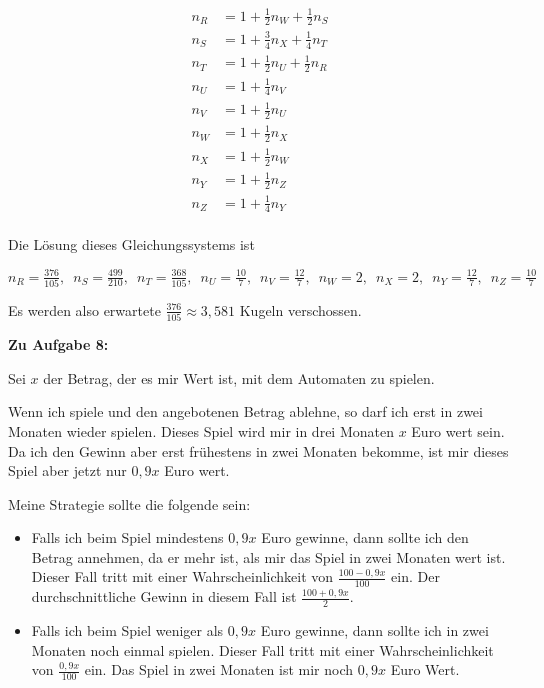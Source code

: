 \documentclass{article}
\begin{document}
\begin{align*}
  n_R & = 1 + \tfrac{1}{2} n_W + \tfrac{1}{2} n_S \\
  n_S & = 1 + \tfrac{3}{4} n_X + \tfrac{1}{4} n_T \\
  n_T & = 1 + \tfrac{1}{2} n_U + \tfrac{1}{2} n_R \\
  n_U & = 1 + \tfrac{1}{4} n_V \\
  n_V & = 1 + \tfrac{1}{2} n_U \\
  n_W & = 1 + \tfrac{1}{2} n_X \\
  n_X & = 1 + \tfrac{1}{2} n_W \\
  n_Y & = 1 + \tfrac{1}{2} n_Z \\
  n_Z & = 1 + \tfrac{1}{4} n_Y \\
\end{align*}

Die Lösung dieses Gleichungssystems ist

\[
  n_R = \tfrac{376}{105}, \enspace
  n_S = \tfrac{499}{210}, \enspace
  n_T = \tfrac{368}{105}, \enspace
  n_U = \tfrac{10}{7}, \enspace
  n_V = \tfrac{12}{7}, \enspace
  n_W = 2, \enspace
  n_X = 2, \enspace
  n_Y = \tfrac{12}{7}, \enspace
  n_Z = \tfrac{10}{7}
\]

Es werden also erwartete $\tfrac{376}{105} \approx 3,581$ Kugeln verschossen.

\textbf{Zu Aufgabe 8:}

Sei $x$ der Betrag, der es mir Wert ist, mit dem Automaten zu spielen.

Wenn ich spiele und den angebotenen Betrag ablehne, so darf ich erst in zwei Monaten wieder spielen.
Dieses Spiel wird mir in drei Monaten $x$ Euro wert sein.
Da ich den Gewinn aber erst frühestens in zwei Monaten bekomme, ist mir dieses Spiel aber jetzt nur $0,9 x$ Euro wert.

Meine Strategie sollte die folgende sein:

\begin{itemize}
  \item Falls ich beim Spiel mindestens $0,9 x$ Euro gewinne, dann sollte ich den Betrag annehmen, da er mehr ist, als mir das Spiel in zwei Monaten wert ist. Dieser Fall tritt mit einer Wahrscheinlichkeit von $\tfrac{100 - 0,9 x}{100}$ ein. Der durchschnittliche Gewinn in diesem Fall ist $\tfrac{100 + 0,9 x}{2}$.
  \item Falls ich beim Spiel weniger als $0,9 x$ Euro gewinne, dann sollte ich in zwei Monaten noch einmal spielen. Dieser Fall tritt mit einer Wahrscheinlichkeit von $\tfrac{0,9 x}{100}$ ein. Das Spiel in zwei Monaten ist mir noch $0,9 x$ Euro Wert.
\end{itemize}
\end{document}
